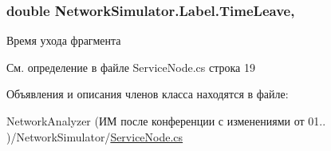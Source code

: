 \subsubsection[{\texorpdfstring{Time\+Leave}{TimeLeave}}]{\setlength{\rightskip}{0pt plus 5cm}double Network\+Simulator.\+Label.\+Time\+Leave\hspace{0.3cm}{\ttfamily [get]}, {\ttfamily [set]}}\hypertarget{class_network_simulator_1_1_label_a9b7cae531ffa9a0c7de7260635eaaf1e}{}\label{class_network_simulator_1_1_label_a9b7cae531ffa9a0c7de7260635eaaf1e}


Время ухода фрагмента 



См. определение в файле Service\+Node.\+cs строка 19



Объявления и описания членов класса находятся в файле\+:\begin{DoxyCompactItemize}
\item 
Network\+Analyzer (ИМ после конференции  с изменениями от 01.. )/\+Network\+Simulator/\hyperlink{_service_node_8cs}{Service\+Node.\+cs}\end{DoxyCompactItemize}
